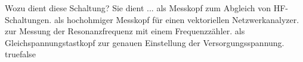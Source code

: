     {Wozu dient diese Schaltung? Sie dient ...}
    {als Messkopf zum Abgleich von HF-Schaltungen.}
    {als hochohmiger Messkopf für einen vektoriellen Netzwerkanalyzer.}
    {zur Messung der Resonanzfrequenz mit einem Frequenzzähler.}
    {als Gleichspannungstastkopf zur genauen Einstellung der Versorgungsspannung.}
    {true}{false}